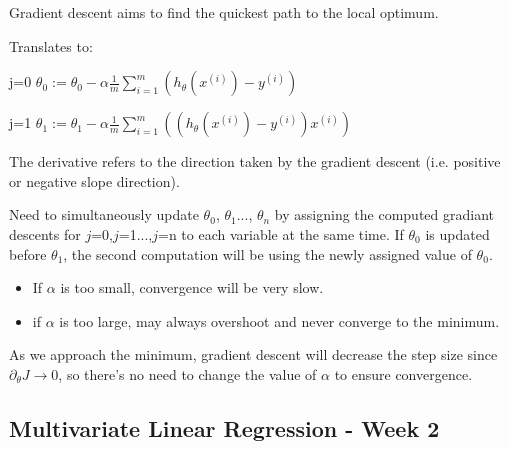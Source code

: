 \documentclass[12pt] {article}
\newcommand{\ind}{{(i)}}
\begin{document}
    Gradient descent aims to find the quickest path to the local optimum.  

    Translates to:

    j=0 \qquad $\theta_0 := \theta_0 - \alpha \frac{1}{m} 
    \sum\limits_{i=1}^{m}(h_\theta(x^\ind) - y^\ind)$

    j=1 \qquad $\theta_1 := \theta_1 - \alpha \frac{1}{m} 
    \sum\limits_{i=1}^{m}((h_\theta(x^\ind) - y^\ind)x^\ind)$

    The derivative refers to the direction taken by the gradient descent 
    (i.e. positive or negative slope direction).

    Need to simultaneously update $\theta_0$, $\theta_1$..., 
    $\theta_n$ by assigning the computed gradiant descents for 
    $j$=0,$j$=1...,$j$=n to each variable at the same time. If $\theta_0$ is 
    updated before $\theta_1$, the second computation will be using the newly 
    assigned value of $\theta_0$.
    \begin{itemize}
      \item If $\alpha$ is too small, convergence will be very slow.
      \item if $\alpha$ is too large, may always overshoot and never converge to the minimum. 
    \end{itemize}

As we approach the minimum, gradient descent will decrease the step size since $\partial_\theta J \to 0$, so there's no need to change the value of $\alpha$ to ensure convergence.
\newpage

\subsection{Multivariate Linear Regression - Week 2}
\end{document}
